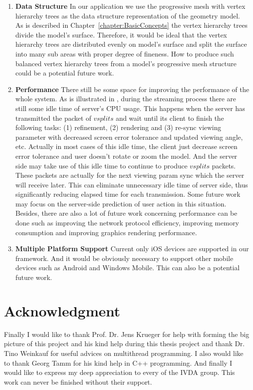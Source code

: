 \begin{enumerate}
\item
\textbf{Data Structure}	In our application we use the progressive mesh with vertex hierarchy trees as the data structure representation of the geometry model. As is described in Chapter~\ref{chapter:BasicConcepts} the vertex hierarchy trees divide the model's surface. Therefore, it would be ideal that the vertex hierarchy trees are distributed evenly on model's surface and split the surface into many sub areas with proper degree of fineness. How to produce such balanced vertex hierarchy trees from a model's progressive mesh structure could be a potential future work. 

\item
\textbf{Performance}		There still be some space for improving the performance of the whole system. As is illustrated in , during the streaming process there are still some idle time of server's CPU usage. This happens when the server has transmitted the packet of $vsplits$ and wait until its client to finish the following tasks: (1) refinement, (2) rendering and (3) re-sync viewing parameter with decreased screen error tolerance and updated viewing angle, etc. Actually in most cases of this idle time, the client just decrease screen error tolerance and user doesn't rotate or zoom the model. And the server side may take use of this idle time to continue to produce $vsplits$ packets. These packets are actually for the next viewing param sync which the server will receive later. This can eliminate unnecessary idle time of server side, thus significantly reducing elapsed time for each transmission. Some future work may focus on the server-side prediction of user action in this situation. Besides, there are also a lot of future work concerning performance can be done such as improving the network protocol efficiency, improving memory consumption and improving graphics rendering performance. 

\item
\textbf{Multiple Platform Support}	Current only iOS devices are supported in our framework. And it would be obviously necessary to support other mobile devices such as Android and Windows Mobile. This can also be a potential future work. 

\end{enumerate}

\section{Acknowledgment}
\label{section:acknowledgement}
Finally I would like to thank Prof. Dr. Jens Krueger for help with forming the big picture of this project and his kind help during this thesis project and thank Dr. Tino Weinkauf for useful advices on multithread programming. I also would like to thank Georg Tamm for his kind help in C++ programming. And finally I would like to express my deep appreciation to every of the IVDA group. This work can never be finished without their support.



